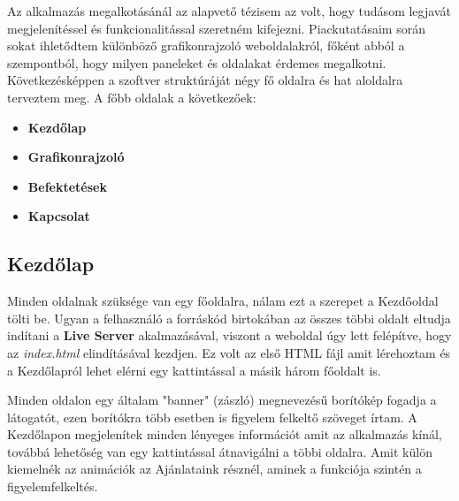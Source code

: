 Az alkalmazás megalkotásánál az alapvető tézisem az volt, hogy tudásom legjavát  megjelenítéssel és funkcionalitással szeretném kifejezni. Piackutatásaim során sokat ihletődtem különböző grafikonrajzoló weboldalakról, főként abból a szempontból, hogy milyen paneleket és oldalakat érdemes megalkotni. Következésképpen a szoftver struktúráját négy fő oldalra és hat aloldalra terveztem meg.\cite{Aegon} A főbb oldalak a következőek: 

\begin{itemize}
\item \textbf{Kezdőlap}
\item \textbf{Grafikonrajzoló}
\item \textbf{Befektetések}
\item \textbf{Kapcsolat}
\end{itemize}

\subsection{Kezdőlap}

Minden oldalnak szüksége van egy főoldalra, nálam ezt a szerepet a Kezdőoldal tölti be. Ugyan a felhasználó a forráskód birtokában az összes többi oldalt eltudja indítani a \textbf{Live Server} akalmazásával, viszont a weboldal úgy lett felépítve, hogy az \emph{index.html} elindításával kezdjen. Ez volt az első HTML fájl amit lérehoztam és a Kezdőlapról lehet elérni egy kattintással a másik három főoldalt is.

	Minden oldalon egy általam "banner" (zászló) megnevezésű borítókép fogadja a látogatót, ezen borítókra több esetben is figyelem felkeltő szöveget írtam. A Kezdőlapon megjelenítek minden lényeges információt amit az alkalmazás kínál, továbbá lehetőség van egy kattintással átnavigálni a többi oldalra. Amit külön kiemelnék az animációk az Ajánlataink résznél, aminek a funkciója szintén a figyelemfelkeltés.

